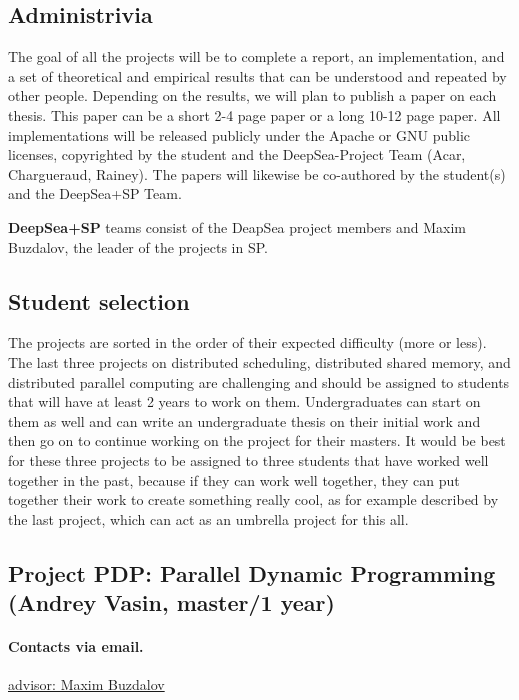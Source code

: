 \documentclass[11pt]{article}
\newcommand{\email}[2]{\href{mailto:#2}{#1}}
\begin{document}
\subsection{Administrivia}

The goal of all the projects will be to complete a report, an
implementation, and a set of theoretical and empirical results that
can be understood and repeated by other people.  Depending on the
results, we will plan to publish a paper on each thesis.  This paper
can be a short 2-4 page paper or a long 10-12 page paper.  All
implementations will be released publicly under the Apache or GNU
public licenses, copyrighted by the student and the DeepSea-Project
Team (Acar, Chargueraud, Rainey).  The papers will likewise be
co-authored by the student(s) and the DeepSea+SP Team.

\textbf{DeepSea+SP} teams consist of the DeapSea project members and
Maxim Buzdalov, the leader of the projects in SP.

\subsection{Student selection}

The projects are sorted in the order of their expected difficulty
(more or less). The last three projects on distributed scheduling,
distributed shared memory, and distributed parallel computing are
challenging and should be assigned to students that will have at least
2 years to work on them. Undergraduates can start on them as well and
can write an undergraduate thesis on their initial work and then go on
to continue working on the project for their masters.  It would be
best for these three projects to be assigned to three students that
have worked well together in the past, because if they can work well
together, they can put together their work to create something really
cool, as for example described by the last project, which can act as
an umbrella project for this all.







\subsection{Project PDP: Parallel Dynamic Programming (Andrey Vasin,
  master/1 year)}

\paragraph{Contacts via email.}
\email{advisor: Maxim Buzdalov}{mbuzdalov@gmail.com}
\end{document}
